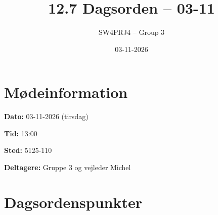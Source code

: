 \documentclass[a4paper,11pt]{article}
\title{12.7 Dagsorden -- 03-11}
\author{SW4PRJ4 -- Group 3}
\date{03-11-2026}
\begin{document}
\maketitle

\section*{Mødeinformation}

\textbf{Dato:} 03-11-2026 (tirsdag)

\textbf{Tid:} 13:00

\textbf{Sted:} 5125-110

\textbf{Deltagere:} Gruppe 3 og vejleder Michel

\section*{Dagsordenspunkter}
\end{document}
